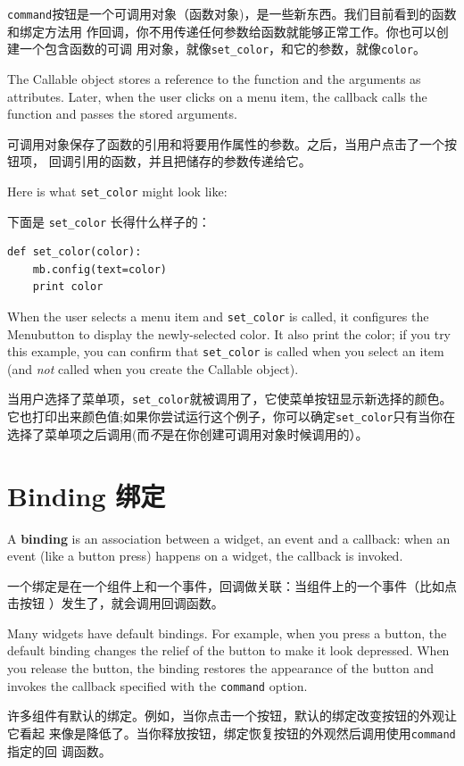 \documentclass[10pt]{book}
\begin{document}
\begin{CJK}{UTF8}{gbsn}
{\tt command}按钮是一个可调用对象（函数对象)，是一些新东西。我们目前看到的函数和绑定方法用
作回调，你不用传递任何参数给函数就能够正常工作。你也可以创建一个包含函数的可调
用对象，就像\verb"set_color"，和它的参数，就像{\tt color}。

The Callable object stores a reference to the function and the
arguments as attributes.  Later, when the user clicks on a menu
item, the callback calls the function and passes the stored
arguments.

可调用对象保存了函数的引用和将要用作属性的参数。之后，当用户点击了一个按钮项，
回调引用的函数，并且把储存的参数传递给它。

Here is what \verb"set_color" might look like:

下面是 \verb"set_color" 长得什么样子的：

\begin{verbatim}
def set_color(color):
    mb.config(text=color)
    print color
\end{verbatim}
%
When the user selects a menu item and \verb"set_color" is called,
it configures the Menubutton to display the newly-selected color.
It also print the color; if you try this example, you can confirm that
\verb"set_color" is called when you select an item (and {\em not}
called when you create the Callable object).

当用户选择了菜单项，\verb"set_color"就被调用了，它使菜单按钮显示新选择的颜色。
它也打印出来颜色值;如果你尝试运行这个例子，你可以确定\verb"set_color"只有当你在
选择了菜单项之后调用(而{\em 不}是在你创建可调用对象时候调用的）。


\section{Binding 绑定}

A {\bf binding} is an association between a widget, an event and a
callback: when an event (like a button press) happens on a widget, the
callback is invoked.

一个绑定是在一个组件上和一个事件，回调做关联：当组件上的一个事件（比如点击按钮
）发生了，就会调用回调函数。

Many widgets have default bindings.  For example, when you press
a button, the default binding changes the relief of the button
to make it look depressed.  When you release the button, the
binding restores the appearance of the button and invokes the
callback specified with the {\tt command} option.

许多组件有默认的绑定。例如，当你点击一个按钮，默认的绑定改变按钮的外观让它看起
来像是降低了。当你释放按钮，绑定恢复按钮的外观然后调用使用{\tt command}指定的回
调函数。


\end{CJK}
\end{document}
